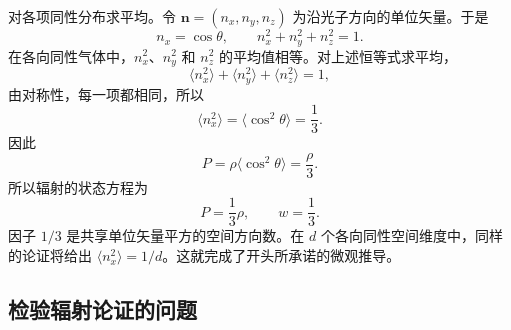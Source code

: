 对各项同性分布求平均。令 \(\mathbf n=(n_x,n_y,n_z)\) 为沿光子方向的单位矢量。于是
\begin{equation}
n_x=\cos\theta,
\qquad
n_x^2+n_y^2+n_z^2=1.
\end{equation}
在各向同性气体中，\(n_x^2\)、\(n_y^2\) 和 \(n_z^2\) 的平均值相等。对上述恒等式求平均，
\begin{equation}
\langle n_x^2\rangle+\langle n_y^2\rangle+\langle n_z^2\rangle=1,
\end{equation}
由对称性，每一项都相同，所以
\begin{equation}
\langle n_x^2\rangle=\langle \cos^2\theta\rangle=\frac13.
\end{equation}
因此
\begin{equation}
P=\rho\langle \cos^2\theta\rangle=\frac{\rho}{3}.
\end{equation}
所以辐射的状态方程为
\begin{equation}
P=\frac13\rho,
\qquad
w=\frac13.
\end{equation}
因子 \(1/3\) 是共享单位矢量平方的空间方向数。在 \(d\) 个各向同性空间维度中，同样的论证将给出 \(\langle n_x^2\rangle=1/d\)。这就完成了开头所承诺的微观推导。

\subsection{检验辐射论证的问题}

\begin{classroomqa}
\end{classroomqa}

\begin{classroomqa}
\end{classroomqa}

\begin{classroomqa}
\end{classroomqa}

